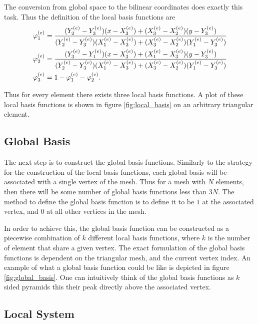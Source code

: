 \documentclass[../fem.tex]{subfile}
\begin{document}
The conversion from global space to the bilinear coordinates does exactly this
task. Thus the definition of the local basis functions are
\begin{align}
  \begin{split}
    \varphi^{(e)}_1&=\frac{(Y^{(e)}_2-Y^{(e)}_3)(x-X^{(e)}_3)+(X^{(e)}_3-X^{(e)}_2)(y-Y^{(e)}_3)}{(Y^{(e)}_2-Y^{(e)}_3)(X^{(e)}_1-X^{(e)}_3)+(X^{(e)}_3-X^{(e)}_2)(Y^{(e)}_1-Y^{(e)}_3)}\\
    \varphi^{(e)}_2&=\frac{(Y^{(e)}_3-Y^{(e)}_1)(x-X^{(e)}_3)+(X^{(e)}_1-X^{(e)}_3)(y-Y^{(e)}_3)}{(Y^{(e)}_2-Y^{(e)}_3)(X^{(e)}_1-X^{(e)}_3)+(X^{(e)}_3-X^{(e)}_2)(Y^{(e)}_1-Y^{(e)}_3)}\\
    \varphi^{(e)}_3&=1-\varphi^{(e)}_1-\varphi^{(e)}_2.
  \end{split}
\end{align}

Thus for every element there exists three local basis functions. A plot of
these local basis functions is shown in figure \ref{fig:local_basis} on an
arbitrary triangular element.

\subsection{Global Basis}%
\label{sub:global_basis}

The next step is to construct the global basis functions. Similarly to the
strategy for the construction of the local basis functions, each global basis
will be associated with a single vertex of the mesh. Thus for a mesh with $N$
elements, then there will be some number of global basis functions less than
$3N$. The method to define the global basis function is to define it to be $1$
at the associated vertex, and $0$ at all other vertices in the mesh.

In order to achieve this, the global basis function can be constructed as a
piecewise combination of $k$ different local basis functions, where $k$ is the
number of element that share a given vertex. The exact formulation of the
global basis functions is dependent on the triangular mesh, and the current
vertex index. An example of what a global basis function could be like is
depicted in figure \ref{fig:global_basis}. One can intuitively think of the
global basis functions as $k$ sided pyramids this their peak directly above the
associated vertex.

\subsection{Local System}%
\label{sub:local_system}
\end{document}
